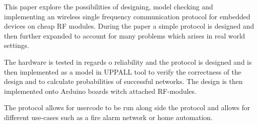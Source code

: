 This paper explore the possibilities of designing, model checking and implementing an wireless single frequency communication protocol for embedded devices on cheap RF modules.
During the paper a simple protocol is designed and then further expanded to account for many problems which arises in real world settings.

The hardware is tested in regards o reliability and the protocol is designed and is then implemented as a model in UPPALL tool to verify the correctness of the design and to calculate probabilities of successful networks.
The design is then implemented onto Arduino boards witch attached RF-modules.

The protocol allows for usercode to be run along side the protocol and allows for different use-cases such as a fire alarm network or home automation. 



